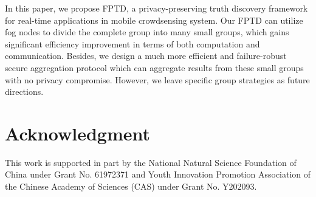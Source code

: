 \documentclass[conference,a4paper]{IEEEtran}
\begin{document}
In this paper, we propose FPTD, a privacy-preserving truth discovery framework for real-time applications in mobile crowdsensing system. Our FPTD can utilize fog nodes to divide the complete group into many small groups, which gains significant efficiency improvement in terms of both computation and communication. Besides, we design a much more efficient and failure-robust secure aggregation protocol which can aggregate results from these small groups with no privacy compromise. However, we leave specific group strategies as future directions.

\section*{Acknowledgment}
This work is supported in part by the National Natural Science Foundation of China under Grant No. 61972371 and Youth Innovation Promotion Association of the Chinese Academy of Sciences (CAS) under Grant No. Y202093.


\end{document}
